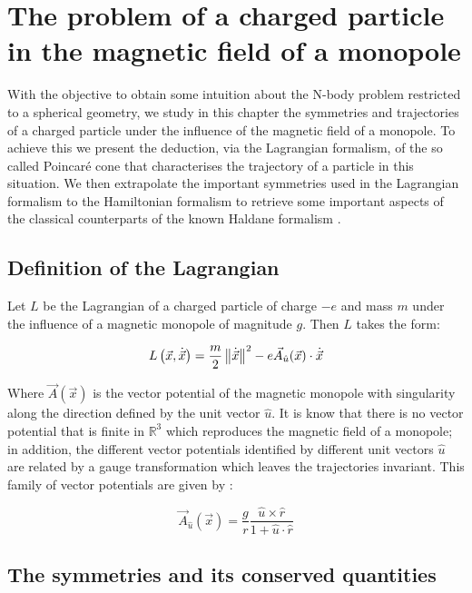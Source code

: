 \chapter{The problem of a charged particle in the magnetic field of a monopole}

With the objective to obtain some intuition about the N-body problem restricted to a spherical geometry, we study in this chapter the symmetries and trajectories of a charged particle under the influence of the magnetic field of a monopole. To achieve this we present the deduction, via the Lagrangian formalism, of the so called Poincar\'e cone \cite{poincare} that characterises the trajectory of a particle in this situation. We then extrapolate the important symmetries used in the Lagrangian formalism to the Hamiltonian formalism to retrieve some important aspects of the classical counterparts of the known Haldane formalism \cite{haldane}.\\

\section{Definition of the Lagrangian}
Let $L$ be the Lagrangian of a charged particle of charge $-e$ and mass $m$ under the influence of a magnetic monopole of magnitude $g$. Then $L$ takes the form:

\begin{equation}
L\left( \vec{x},\dot{\vec{x}} \right) = \frac{m}{2}\left\lVert \dot{\vec{x}} \right\rVert^2 - e\vec{A}_{\hat{u}}(\vec{x})\cdot\dot{\vec{x}}
\label{eq:lagrangian}
\end{equation}

Where $\vec{A}(\vec{x})$ is the vector potential of the magnetic monopole with singularity along the direction defined by the unit vector $\hat{u}$. It is know that there is no vector potential that is finite in $\mathbb{R}^3$ which reproduces the magnetic field of a monopole; in addition, the different vector potentials identified by different unit vectors $\hat{u}$ are related by a gauge transformation which leaves the trajectories invariant. This family of vector potentials are given by \cite{poincare}:

\begin{equation}
\vec{A}_{\hat{u}}(\vec{x}) = \frac{g}{r}\frac{\hat{u}\times\hat{r}}{1+\hat{u}\cdot\hat{r}}
\label{eq:monopolepotential}
\end{equation}

\section{The symmetries and its conserved quantities}

